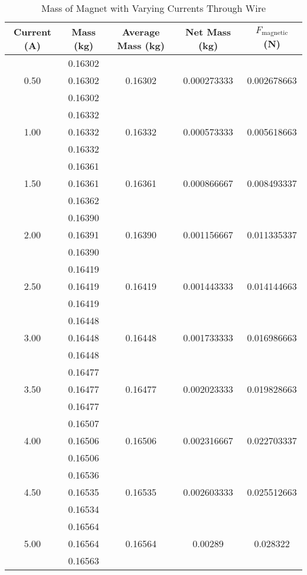 \documentclass [12pt, letterpaper, twoside]{article}
\begin{document}
\begin{table}
  \centering
  \begin{tabular}{| c | c | c | c | c |}
    \hline\hline
    Current (A) & Mass (kg) & Average Mass (kg) & Net Mass (kg) & \(F_{\text{magnetic}}\) (N) \\
    \hline
    \multirow{3}{*}{0.50} & 0.16302 & & & \\
    & 0.16302 & 0.16302 & 0.000273333 & 0.002678663 \\
    & 0.16302 & & & \\
    \hline
    \multirow{3}{*}{1.00} & 0.16332 & & & \\
    & 0.16332 & 0.16332 & 0.000573333 & 0.005618663 \\
    & 0.16332 & & & \\
    \hline
    \multirow{3}{*}{1.50} & 0.16361 & & & \\
    & 0.16361 & 0.16361 & 0.000866667 & 0.008493337 \\
    & 0.16362 & & & \\
    \hline
    \multirow{3}{*}{2.00} & 0.16390 & & & \\
    & 0.16391 & 0.16390 & 0.001156667 & 0.011335337 \\
    & 0.16390 & & & \\
    \hline
    \multirow{3}{*}{2.50} & 0.16419 & & & \\
    & 0.16419 & 0.16419 & 0.001443333 & 0.014144663 \\
    & 0.16419 & & & \\
    \hline
    \multirow{3}{*}{3.00} & 0.16448 & & & \\
    & 0.16448 & 0.16448 & 0.001733333 & 0.016986663 \\
    & 0.16448 & & & \\
    \hline
    \multirow{3}{*}{3.50} & 0.16477 & & & \\
    & 0.16477 & 0.16477 & 0.002023333 & 0.019828663 \\
    & 0.16477 & & & \\
    \hline
    \multirow{3}{*}{4.00} & 0.16507 & & & \\
    & 0.16506 & 0.16506 & 0.002316667 & 0.022703337 \\
    & 0.16506 & & & \\
    \hline
    \multirow{3}{*}{4.50} & 0.16536 & & & \\
    & 0.16535 & 0.16535 & 0.002603333 & 0.025512663 \\
    & 0.16534 & & & \\
    \hline
    \multirow{3}{*}{5.00} & 0.16564 & & & \\
    & 0.16564 & 0.16564 & 0.00289 & 0.028322 \\
    & 0.16563 & & & \\
    \hline\hline
  \end{tabular}
  \caption{Mass of Magnet with Varying Currents Through Wire}
  \label{fig:tab1}
\end{table}
\end{document}
